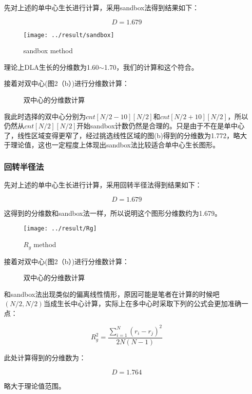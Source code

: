 \documentclass[UTF8]{ctexart}
\begin{document}
	\begin{flushleft}
		先对上述的单中心生长进行计算，采用sandbox法得到结果如下：
		
		$$D=1.679$$	
		
			\begin{figure}[H]
				\centering\texttt{[image: ../result/sandbox]}
				\caption{sandbox method}
				\end{figure}
	
		理论上DLA生长的分维数为1.60$\sim$1.70，我们的计算和这个符合。
		
		接着对双中心(图2（b）)进行分维数计算：
		
		\begin{figure}[H]
			\centering  %
			\caption{双中心的分维数计算}
		\end{figure}
	
	我此时选择的双中心分别为$cnt[N/2-10][N/2]$和$cnt[N/2+10][N/2]$，所以仍然从$cnt[N/2][N/2]$开始sandbox计数仍然是合理的。只是由于不在是单中心了，线性区域变得更窄了，经过挑选线性区域的图(b)得到的分维数为1.772，略大于理论值，这也一定程度上体现出sandbox法比较适合单中心生长图形。
	
	\subsubsection{回转半径法}
	
	先对上述的单中心生长进行计算，采用回转半径法得到结果如下：
	
	$$D=1.679$$

	这得到的分维数和sandbox法一样，所以说明这个图形分维数约为1.679。
	
	\begin{figure}[H]
		\centering\texttt{[image: ../result/Rg]}
		\caption{$R_g$ method}
	\end{figure}
	
	接着对双中心(图2（b）)进行分维数计算：
	
	\begin{figure}[H]
		\centering  %
		\caption{双中心的分维数计算}
	\end{figure}
	
	和sandbox法出现类似的偏离线性情形，原因可能是笔者在计算的时候吧$(N/2,N/2)$当成生长中心计算，实际上在多中心时采取下列的公式会更加准确一点：
	
	$$R_g^2=\frac{\sum_{i=1}^N (r_i-r_j)^2}{2N(N-1)}$$
	
	此处计算得到的分维数为：
	
	$$D=1.764$$
	
	略大于理论值范围。
	
		
	\end{flushleft}
	
\end{document}
